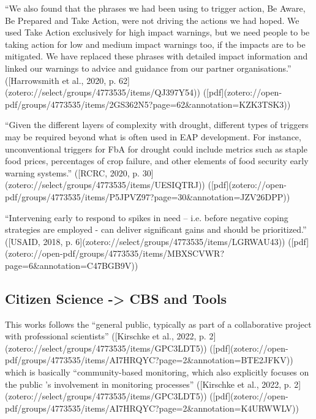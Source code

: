 
“We also found that the phrases we had been using to trigger action, Be Aware, Be Prepared and Take Action, were not driving the actions we had hoped. We used Take Action exclusively for high impact warnings, but we need people to be taking action for low and medium impact warnings too, if the impacts are to be mitigated. We have replaced these phrases with detailed impact information and linked our warnings to advice and guidance from our partner organisations.” ([Harrowsmith et al., 2020, p. 62](zotero://select/groups/4773535/items/QJ397Y54)) ([pdf](zotero://open-pdf/groups/4773535/items/2GS362N5?page=62&annotation=KZK3TSK3))


“Given the different layers of complexity with drought, different types of triggers may be required beyond what is often used in EAP development. For instance, unconventional triggers for FbA for drought could include metrics such as staple food prices, percentages of crop failure, and other elements of food security early warning systems.” ([RCRC, 2020, p. 30](zotero://select/groups/4773535/items/UESIQTRJ)) ([pdf](zotero://open-pdf/groups/4773535/items/P5JPVZ97?page=30&annotation=JZV26DPP))

“Intervening early to respond to spikes in need – i.e. before negative coping strategies are employed - can deliver significant gains and should be prioritized.” ([USAID, 2018, p. 6](zotero://select/groups/4773535/items/LGRWAU43)) ([pdf](zotero://open-pdf/groups/4773535/items/MBXSCVWR?page=6&annotation=C47BGB9V))

\subsection{Citizen Science -> CBS and Tools}
This works follows the “general public, typically as part of a collaborative project with professional scientists” ([Kirschke et al., 2022, p. 2](zotero://select/groups/4773535/items/GPC3LDT5)) ([pdf](zotero://open-pdf/groups/4773535/items/AI7HRQYC?page=2&annotation=BTE2JFKV)) which is basically “community-based monitoring, which also explicitly focuses on the public ’s involvement in monitoring processes” ([Kirschke et al., 2022, p. 2](zotero://select/groups/4773535/items/GPC3LDT5)) ([pdf](zotero://open-pdf/groups/4773535/items/AI7HRQYC?page=2&annotation=K4URWWLV))

